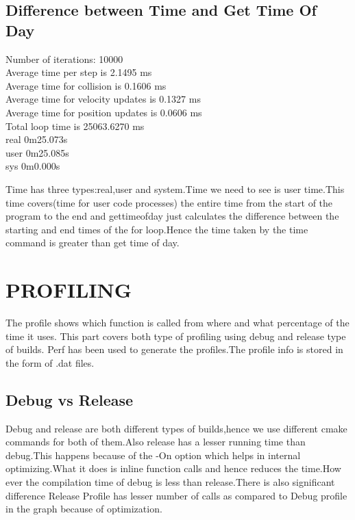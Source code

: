 \documentclass[11pt]{article}
\begin{document}
\subsection{Difference between Time and Get Time Of Day}
\begin{center}
Number of iterations: 10000\\
Average time per step is 2.1495 ms\\
Average time for collision is 0.1606 ms\\
Average time for velocity updates is 0.1327 ms\\
Average time for position updates is 0.0606 ms\\
Total loop time is 25063.6270 ms\\
real	0m25.073s\\
user	0m25.085s\\
sys	0m0.000s\\
\end{center}
Time has three types:real,user and system.Time we need to see is user time.This time covers(time for user code processes) the entire time from the start of the program to the end  and  gettimeofday  just calculates the difference between the starting and end times of the for loop.Hence the time taken by the time command is greater than get time of day. 
\section{PROFILING}
The profile shows which function is called from where and what percentage of the time it uses.
This part covers both type of profiling using debug and release type of builds.
Perf has been used to generate the profiles.The profile info is stored in the form of .dat files.
\subsection{Debug vs Release}
Debug and release are both different types of builds,hence we use different cmake commands for both of them.Also release has a lesser running time than debug.This happens because  of the -On option which helps in internal optimizing.What it does is inline function calls and hence reduces the time.How ever the compilation time  of debug  is less than release.There is also significant difference 
Release Profile has lesser number of calls as compared to  Debug profile in the graph because of optimization.
\end{document}
